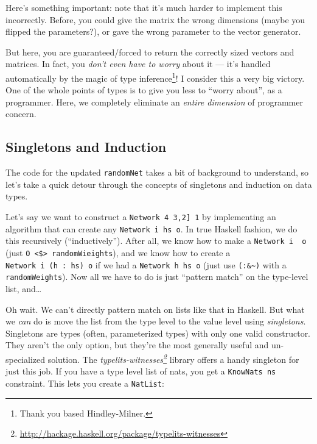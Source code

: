 \documentclass[]{article}
\renewcommand{\href}[2]{#2\footnote{\url{#1}}}
\begin{document}
Here's something important: note that it's much harder to implement this
incorrectly. Before, you could give the matrix the wrong dimensions
(maybe you flipped the parameters?), or gave the wrong parameter to the
vector generator.

But here, you are guaranteed/forced to return the correctly sized
vectors and matrices. In fact, you \emph{don't even have to worry} about
it --- it's handled automatically by the magic of type
inference\footnote{Thank you based Hindley-Milner.}! I consider this a
very big victory. One of the whole points of types is to give you less
to ``worry about'', as a programmer. Here, we completely eliminate an
\emph{entire dimension} of programmer concern.

\subsection{Singletons and Induction}\label{singletons-and-induction}

The code for the updated \texttt{randomNet} takes a bit of background to
understand, so let's take a quick detour through the concepts of
singletons and induction on data types.

Let's say we want to construct a
\texttt{Network\ 4\ \textquotesingle{}{[}3,2{]}\ 1} by implementing an
algorithm that can create any \texttt{Network\ i\ hs\ o}. In true
Haskell fashion, we do this recursively (``inductively''). After all, we
know how to make a \texttt{Network\ i\ \textquotesingle{}{[}{]}\ o}
(just \texttt{O\ \textless{}\$\textgreater{}\ randomWieights}), and we
know how to create a
\texttt{Network\ i\ (h\ \textquotesingle{}:\ hs)\ o} if we had a
\texttt{Network\ h\ hs\ o} (just use \texttt{(:\&\textasciitilde{})}
with a \texttt{randomWeights}). Now all we have to do is just ``pattern
match'' on the type-level list, and\ldots{}

Oh wait. We can't directly pattern match on lists like that in Haskell.
But what we \emph{can} do is move the list from the type level to the
value level using \emph{singletons}. Singletons are types (often,
parameterized types) with only one valid constructor. They aren't the
only option, but they're the most generally useful and un-specialized
solution. The
\emph{\href{http://hackage.haskell.org/package/typelits-witnesses}{typelits-witnesses}}
library offers a handy singleton for just this job. If you have a type
level list of nats, you get a \texttt{KnowNats\ ns} constraint. This
lets you create a \texttt{NatList}:
\end{document}
